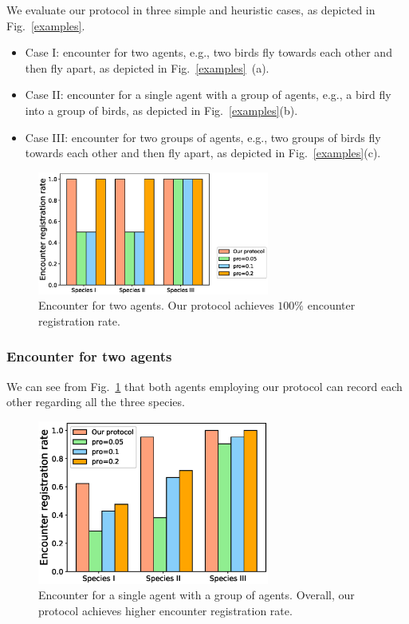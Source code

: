 We evaluate our protocol in three simple and heuristic cases, as depicted in Fig.~\ref{examples}.
\begin{itemize}
    \item Case I: encounter for two agents, 
    e.g., two birds fly towards each other and then 
    fly apart, as depicted in Fig.~\ref{examples}~(a). 
    \item Case II: encounter for a single 
    agent with a group of agents, e.g., a bird fly into 
    a group of birds, as depicted in Fig.~\ref{examples}(b).
    \item Case III: encounter for two groups of agents, 
    e.g., two groups of birds fly towards each other and then fly 
    apart, as depicted in Fig.~\ref{examples}(c).
\end{itemize}

\begin{figure}[!h]
    \centering
    \includegraphics[width=3in]{figures/figure7.eps}
    \caption{Encounter for two agents. Our protocol
    achieves $100\%$ encounter registration rate.}
    \label{fig7}
\end{figure}

\subsubsection{Encounter for two agents}

We can see from Fig.~\ref{fig7} that both
agents employing our protocol can record each
other regarding all the three species.

\begin{figure}[!h]
    \centering
    \includegraphics[width=3in]{figures/figure8.eps}
    \caption{Encounter for a single 
    agent with a group of agents. Overall, our protocol
    achieves higher encounter registration rate.}
    \label{fig8}
\end{figure}

